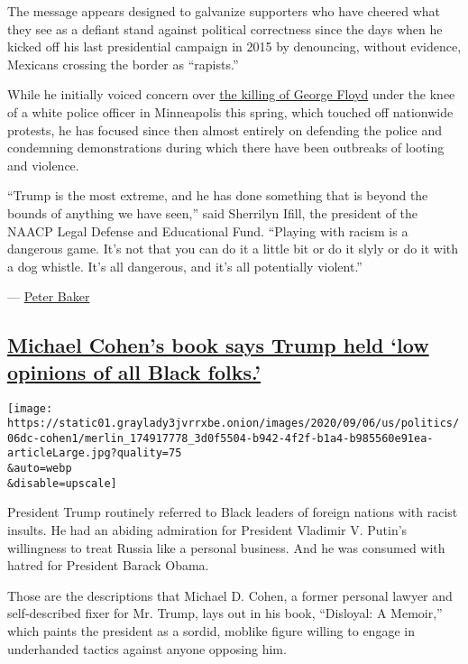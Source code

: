 The message appears designed to galvanize supporters who have cheered
what they see as a defiant stand against political correctness since the
days when he kicked off his last presidential campaign in 2015 by
denouncing, without evidence, Mexicans crossing the border as
``rapists.''

While he initially voiced concern over
\href{https://www.nytimes3xbfgragh.onion/2020/05/31/us/george-floyd-investigation.html}{the
killing of George Floyd} under the knee of a white police officer in
Minneapolis this spring, which touched off nationwide protests, he has
focused since then almost entirely on defending the police and
condemning demonstrations during which there have been outbreaks of
looting and violence.

``Trump is the most extreme, and he has done something that is beyond
the bounds of anything we have seen,'' said Sherrilyn Ifill, the
president of the NAACP Legal Defense and Educational Fund. ``Playing
with racism is a dangerous game. It's not that you can do it a little
bit or do it slyly or do it with a dog whistle. It's all dangerous, and
it's all potentially violent.''

--- \href{https://www.nytimes3xbfgragh.onion/by/peter-baker}{Peter
Baker}

\hypertarget{michael-cohens-book-says-trump-held-low-opinions-of-all-black-folks}{%
\subsection{\texorpdfstring{\protect\hyperlink{michael-cohens-book-says-trump-held-low-opinions-of-all-black-folks}{Michael
Cohen's book says Trump held `low opinions of all Black
folks.'}}{Michael Cohen's book says Trump held `low opinions of all Black folks.'}}\label{michael-cohens-book-says-trump-held-low-opinions-of-all-black-folks}}

\texttt{[image: https://static01.graylady3jvrrxbe.onion/images/2020/09/06/us/politics/06dc-cohen1/merlin\_174917778\_3d0f5504-b942-4f2f-b1a4-b985560e91ea-articleLarge.jpg?quality=75\\\&auto=webp\\\&disable=upscale]}

President Trump routinely referred to Black leaders of foreign nations
with racist insults. He had an abiding admiration for President Vladimir
V. Putin's willingness to treat Russia like a personal business. And he
was consumed with hatred for President Barack Obama.

Those are the descriptions that Michael D. Cohen, a former personal
lawyer and self-described fixer for Mr. Trump, lays out in his book,
``Disloyal: A Memoir,'' which paints the president as a sordid, moblike
figure willing to engage in underhanded tactics against anyone opposing
him.

